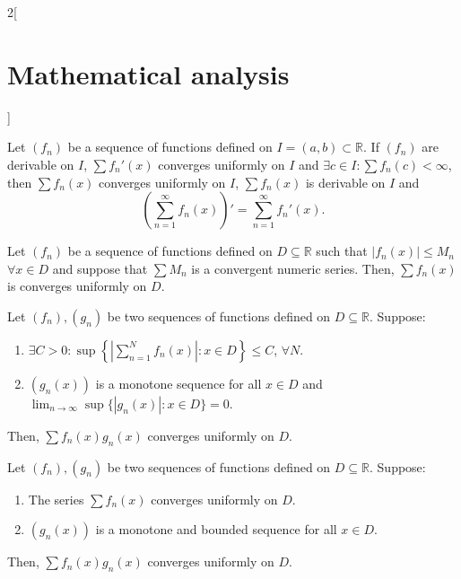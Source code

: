 \documentclass[class=article,crop=false]{standalone}
\begin{document}
\begin{multicols}{2}[\section{Mathematical analysis}]
\begin{theorem}
Let $(f_n)$ be a sequence of functions defined on $I=(a,b)\subset\mathbb{R}$. If $(f_n)$ are derivable on $I$, $\sum f_n'(x)$ converges uniformly on $I$ and $\exists c\in I:\sum f_n(c)<\infty$, then $\sum f_n(x)$ converges uniformly on $I$, $\sum f_n(x)$ is derivable on $I$ and $$\left(\sum_{n=1}^\infty f_n(x)\right)'=\sum_{n=1}^\infty f_n'(x).$$
\end{theorem}
\begin{theorem}
Let $(f_n)$ be a sequence of functions defined on $D\subseteq\mathbb{R}$ such that $|f_n(x)|\leq M_n$ $\forall x\in D$ and suppose that $\sum M_n$ is a convergent numeric series. Then, $\sum f_n(x)$ is converges uniformly on $D$.
\end{theorem}
\begin{theorem}
Let $(f_n),(g_n)$ be two sequences of functions defined on $D\subseteq\mathbb{R}$. Suppose:
\begin{enumerate}
    \item $\displaystyle\exists C>0: \sup\left\{\left|\sum_{n=1}^Nf_n(x)\right|:x\in D\right\}\leq C$, $\forall N$.
    \item $(g_n(x))$ is a monotone sequence for all $x\in D$ and $\displaystyle\lim_{n\to\infty}\sup\{|g_n(x)|:x\in D\}=0$.
\end{enumerate}
Then, $\sum f_n(x)g_n(x)$ converges uniformly on $D$.
\end{theorem}
\begin{theorem}
Let $(f_n),(g_n)$ be two sequences of functions defined on $D\subseteq\mathbb{R}$. Suppose:
\begin{enumerate}
    \item The series $\sum f_n(x)$ converges uniformly on $D$.
    \item $(g_n(x))$ is a monotone and bounded sequence for all $x\in D$.
\end{enumerate}
Then, $\sum f_n(x)g_n(x)$ converges uniformly on $D$.
\end{theorem}

\end{multicols}
\end{document}
